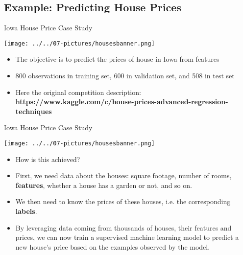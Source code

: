 \documentclass[11pt]{beamer}
\begin{document}
\subsection{Example: Predicting House Prices}
\begin{frame}{Iowa House Price Case Study}
\begin{center}
\texttt{[image: ../../07-pictures/housesbanner.png]} 
\end{center}
	\begin{itemize}
		\item The objective is to predict the prices of house in Iowa from features
		\item 800 observations in training set, 600 in validation set, and 508 in test set
		\item Here the original competition description: \textbf{https://www.kaggle.com/c/house-prices-advanced-regression-techniques}
	\end{itemize}
\end{frame}
\begin{frame}{Iowa House Price Case Study}
\begin{center}
\texttt{[image: ../../07-pictures/housesbanner.png]} 
\end{center}
	\begin{itemize}
	 \item How is this achieved?
	 \item First, we need data about the houses: square footage, number of rooms, \textbf{features}, whether a house has a garden or not, and so on. 
	 \item We then need to know the prices of these houses, i.e. the corresponding \textbf{labels}. 
	 \item By leveraging data coming from thousands of houses, their features and prices, we can now train a supervised machine learning model to predict a new house’s price based on the examples observed by the model. 
	\end{itemize}
\end{frame}
\end{document}
